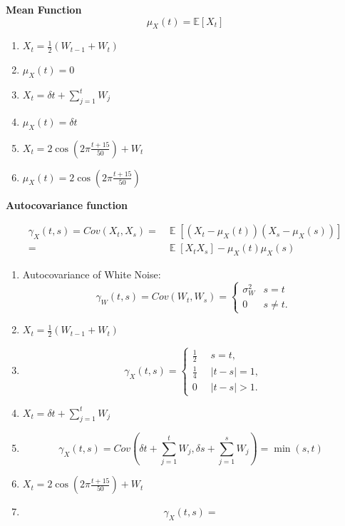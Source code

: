\documentclass[12pt]{article} %
\DeclareMathOperator{\E}{\mathbb{E}}
\DeclareMathOperator{\sigw}{\sigma_w^2}
\begin{document}
\newpage

\noindent\textbf{Mean Function}
$$\mu_X(t)= \mathbb{E}[X_t]$$


\begin{enumerate}
	\item $X_t = \frac{1}{2} (W_{t-1} + W_t )$
	\item[] $\mu_{X} (t)=0$ 
	\item $X_t=\delta t + \sum_{j=1}^{t} W_j$
	\item[] $\mu_{X} (t)= \delta t$
	\item $X_t = 2 \cos (2\pi \frac{t+15}{50}) + W_t$
	\item[] $\mu_{X} (t)= 2 \cos (2\pi \frac{t+15}{50})$
\end{enumerate}

\medskip


\noindent\textbf
{Autocovariance function}

\begin{align*}
	\gamma_X ({t,s})=Cov(X_t,X_s)=&\E[(X_t-\mu_X(t))(X_s-\mu_X(s))]\\
	=&\E[X_t X_s]-\mu_X(t) \mu_X(s)
\end{align*}





\begin{enumerate}
	\item Autocovariance of White Noise:
	\begin{equation}
		\gamma_{W} (t,s)= Cov (W_t, W_s) = 
		\begin{cases}
			\sigma_W^2 & s=t\\
			0 & s\neq t.
		\end{cases}
	\end{equation}

	\item $X_t = \frac{1}{2} (W_{t-1} + W_t )$
	\item[] 
	\begin{equation}
		\gamma_{X} (t,s)=\begin{cases}
			\frac{1}{2} \sigw & s=t,\\
			\frac{1}{4}	\sigw & |t-s|=1,\\
			0 & |t-s|>1.
		\end{cases}
	\end{equation}
	\item $X_t=\delta t + \sum_{j=1}^{t} W_j$
	\item[] 
	\begin{equation}
		\gamma_{X} (t,s)= Cov \left( \delta t + \sum_{j=1}^{t} W_j, \delta s + \sum_{j=1}^{s} W_j\right)
		=\min(s,t) \sigw
	\end{equation}
	\item $X_t = 2 \cos (2\pi \frac{t+15}{50}) + W_t$
	\item[] 
	\begin{equation}
		\gamma_{X} (t,s)=\sigw
	\end{equation}
\end{enumerate}
\end{document}
